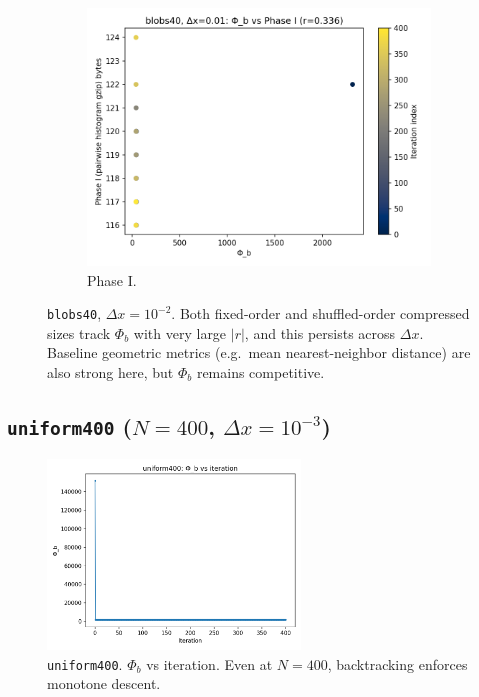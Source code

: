\documentclass[11pt,a4paper]{article}
\numberwithin{equation}{section}
\newcommand{\phib}{\Phi_b}
\begin{document}
\begin{figure}[h!]
\begin{subfigure}[b]{0.32\textwidth}
\includegraphics[width=\textwidth]{figures/blobs40_dx0.01_phib_vs_phase1.png}
\caption{Phase I.}
\end{subfigure}
\caption{\texttt{blobs40}, $\Delta x{=}10^{-2}$. Both fixed-order and shuffled-order compressed sizes track $\phib$ with very large $|r|$, and this persists across $\Delta x$. Baseline geometric metrics (e.g.\ mean nearest-neighbor distance) are also strong here, but $\phib$ remains competitive.}
\label{fig:blobs40_corr}
\end{figure}

\subsection{\texttt{uniform400} ($N{=}400$, $\Delta x = 10^{-3}$)}
\begin{figure}[h!]
\centering
\includegraphics[width=0.6\textwidth]{figures/uniform400_dx0.001_phib_vs_iter.png}
\caption{\texttt{uniform400}. $\phib$ vs iteration. Even at $N{=}400$, backtracking enforces monotone descent.}
\label{fig:uniform400_iter}
\end{figure}
\end{document}
